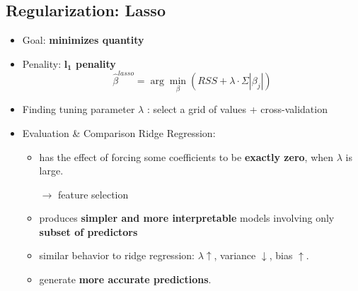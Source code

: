 \subsection{Regularization: Lasso}
\begin{itemize}
	\item Goal: \textbf{minimizes quantity}
	\item Penality: \textbf{$\mathbf{l_1}$ penality}
	$$\hat{\beta}^{lasso} = \arg\min_{\beta} (RSS + \lambda \cdot \Sigma |\beta_j|)$$
	
	\item Finding tuning parameter $\lambda$ : select a grid of values + cross-validation
	\item Evaluation \& Comparison Ridge Regression:
	\begin{itemize}
		\item has the effect of forcing some coefficients to be \textbf{exactly zero}, when $\lambda$ is large. 
		
		$\rightarrow$ feature selection
		\item produces \textbf{simpler and more interpretable} models involving only \textbf{subset of predictors}
		\item similar behavior to ridge regression: $\lambda \uparrow$, variance $\downarrow$, bias $\uparrow$.
		\item generate \textbf{more accurate predictions}.
	\end{itemize}
\end{itemize}